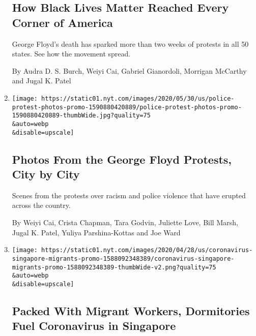 \begin{enumerate}
  \hypertarget{how-black-lives-matter-reached-every-corner-of-america}{%
  \subsection{How Black Lives Matter Reached Every Corner of
  America}\label{how-black-lives-matter-reached-every-corner-of-america}}

  George Floyd's death has sparked more than two weeks of protests in
  all 50 states. See how the movement spread.

  By Audra D. S. Burch, Weiyi Cai, Gabriel Gianordoli, Morrigan McCarthy
  and Jugal K. Patel
\item
  \href{/interactive/2020/05/30/us/george-floyd-protest-photos.html}{}

  \texttt{[image: https://static01.nyt.com/images/2020/05/30/us/police-protest-photos-promo-1590880420889/police-protest-photos-promo-1590880420889-thumbWide.jpg?quality=75\\\&auto=webp\\\&disable=upscale]}

  \hypertarget{photos-from-the-george-floyd-protests-city-by-city}{%
  \subsection{Photos From the George Floyd Protests, City by
  City}\label{photos-from-the-george-floyd-protests-city-by-city}}

  Scenes from the protests over racism and police violence that have
  erupted across the country.

  By Weiyi Cai, Crista Chapman, Tara Godvin, Juliette Love, Bill Marsh,
  Jugal K. Patel, Yuliya Parshina-Kottas and Joe Ward
\item
  \href{/interactive/2020/04/28/world/asia/coronavirus-singapore-migrants.html}{}

  \texttt{[image: https://static01.nyt.com/images/2020/04/28/us/coronavirus-singapore-migrants-promo-1588092348389/coronavirus-singapore-migrants-promo-1588092348389-thumbWide-v2.png?quality=75\\\&auto=webp\\\&disable=upscale]}

  \hypertarget{packed-with-migrant-workers-dormitories-fuel-coronavirus-in-singapore}{%
  \subsection{Packed With Migrant Workers, Dormitories Fuel Coronavirus
  in
  Singapore}\label{packed-with-migrant-workers-dormitories-fuel-coronavirus-in-singapore}}


\end{enumerate}
